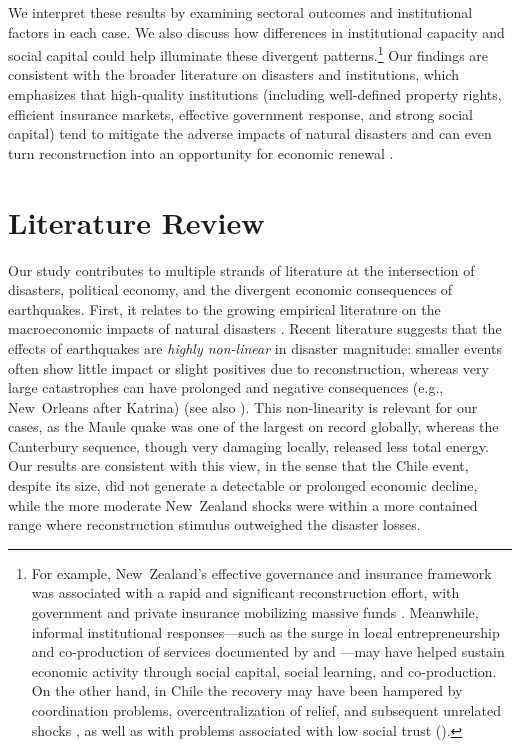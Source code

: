 \documentclass[12pt]{article}
\begin{document}
We interpret these results by examining sectoral outcomes and institutional factors in each case. We also discuss how differences in institutional capacity and social capital could help illuminate these divergent patterns.\footnote{For example, New Zealand’s effective governance and insurance framework was associated with a rapid and significant reconstruction effort, with government and private insurance mobilizing massive funds \parencite{parker2016five, poontirakul2017insurance}. Meanwhile, informal institutional responses—such as the surge in local entrepreneurship and co-production of services documented by \textcite{storr2017sandy} and \textcite{GrubeStorr2018}—may have helped sustain economic activity through social capital, social learning, and co-production. On the other hand, in Chile the recovery may have been hampered by coordination problems, overcentralization of relief, and subsequent unrelated shocks \parencite{eclac2010overview, cardenasjiron2012chilean, cardenas2018talca}, as well as with problems associated with low social trust (\cite{dussaillant2014trust}).} Our findings are consistent with the broader literature on disasters and institutions, which emphasizes that high-quality institutions (including well-defined property rights, efficient insurance markets, effective government response, and strong social capital) tend to mitigate the adverse impacts of natural disasters and can even turn reconstruction into an opportunity for economic renewal \autocite{skidmore2002does, raschky2008institutions, rayamajhee2022coproduction, storr2016community, rayamajhee2024shock}.

\section{Literature Review}
Our study contributes to multiple strands of literature at the intersection of disasters, political economy, and the divergent economic consequences of earthquakes. First, it relates to the growing empirical literature on the macroeconomic impacts of natural disasters \parencite{felbermayr2014disasters, loayza2012natural, porcelli2019impact, skidmore2002does}. Recent literature suggests that the effects of earthquakes are \textit{highly non-linear} in disaster magnitude: smaller events often show little impact or slight positives due to reconstruction, whereas very large catastrophes can have prolonged and negative consequences (e.g., New Orleans after Katrina) (see also \cite{barone2014natural, felbermayr2014disasters, boustan2020effect}). This non-linearity is relevant for our cases, as the Maule quake was one of the largest on record globally, whereas the Canterbury sequence, though very damaging locally, released less total energy. Our results are consistent with this view, in the sense that the Chile event, despite its size, did not generate a detectable or prolonged economic decline, while the more moderate New Zealand shocks were within a more contained range where reconstruction stimulus outweighed the disaster losses.
\end{document}
